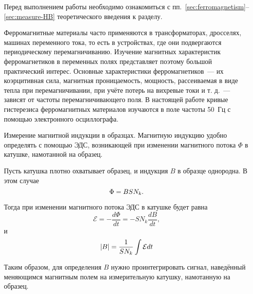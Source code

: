 


Перед выполнением работы необходимо ознакомиться с
пп.~\ref{sec:ferromagnetism}--\ref{sec:measure-HB} теоретического введения к разделу.

Ферромагнитные материалы часто применяются в трансформаторах, дросселях, машинах переменного тока, то есть в устройствах, где они подвергаются периодическому перемагничиванию. Изучение магнитных характеристик ферромагнетиков в переменных полях представляет поэтому большой практический интерес. Основные характеристики ферромагнетиков~--- их коэрцитивная сила, магнитная проницаемость, мощность, рассеиваемая в виде тепла при перемагничивании, при учёте потерь на вихревые токи и т. д.~--- зависят от частоты перемагничивающего поля. В настоящей работе кривые гистерезиса ферромагнитных материалов изучаются в поле частоты 50~Гц с помощью электронного осциллографа.

Измерение магнитной индукции в образцах. Магнитную индукцию удобно определять с помощью ЭДС, возникающей при изменении магнитного потока $\Phi$ в катушке, намотанной на образец.

Пусть катушка плотно охватывает образец, и индукция $B$ в образце однородна. В этом случае
\begin{equation}
	\eqmark{4.5.1}
	\Phi = BSN_k.
\end{equation}

Тогда при изменении магнитного потока ЭДС в катушке будет равна
\begin{equation*}
	\mathcal{E} = -\frac{d\Phi}{dt} = -SN_k\frac{dB}{dt},
\end{equation*}
и
\begin{equation}
	\eqmark{4.5.2}
	|B| = \frac{1}{SN_k}\int \mathcal{E}dt
\end{equation}

Таким образом, для определения $B$ нужно проинтегрировать сигнал, наведённый меняющимся магнитным полем на измерительную катушку, намотанную на образец.

